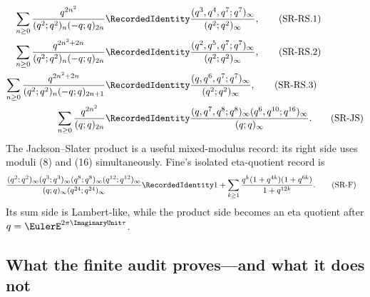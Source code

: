 \begin{align}
 \sum_{n\ge0}\frac{q^{2n^2}}
 {(q^2;q^2)_n(-q;q)_{2n}}
 &\RecordedIdentity
 \frac{(q^3,q^4,q^7;q^7)_\infty}{(q^2;q^2)_\infty},
 \tag{SR-RS.1}\label{qg:eq-record-rs-1}\\
 \sum_{n\ge0}\frac{q^{2n^2+2n}}
 {(q^2;q^2)_n(-q;q)_{2n}}
 &\RecordedIdentity
 \frac{(q^2,q^5,q^7;q^7)_\infty}{(q^2;q^2)_\infty},
 \tag{SR-RS.2}\label{qg:eq-record-rs-2}\\
 \sum_{n\ge0}\frac{q^{2n^2+2n}}
 {(q^2;q^2)_n(-q;q)_{2n+1}}
 &\RecordedIdentity
 \frac{(q,q^6,q^7;q^7)_\infty}{(q^2;q^2)_\infty},
 \tag{SR-RS.3}\label{qg:eq-record-rs-3}\\
 \sum_{n\ge0}\frac{q^{2n^2}}{(q;q)_{2n}}
 &\RecordedIdentity
 \frac{(q,q^7,q^8;q^8)_\infty
       (q^6,q^{10};q^{16})_\infty}
 {(q;q)_\infty}.
 \tag{SR-JS}\label{qg:eq-record-js}
\end{align}
The Jackson--Slater product is a useful mixed-modulus record: its right side
uses moduli (8) and (16) simultaneously.  Fine's isolated eta-quotient
record is
\begin{align}
 &\frac{(q^2;q^2)_\infty(q^3;q^3)_\infty
        (q^8;q^8)_\infty(q^{12};q^{12})_\infty}
       {(q;q)_\infty(q^{24};q^{24})_\infty}
 \RecordedIdentity
 1+\sum_{k\ge1}
 \frac{q^k(1+q^{4k})(1+q^{6k})}{1+q^{12k}}.
 \tag{SR-F}\label{qg:eq-record-fine}
\end{align}
Its sum side is Lambert-like, while the product side becomes an eta quotient
after \(q=\EulerE^{2\pi\ImaginaryUnit\tau}\).

\subsection{What the finite audit proves---and what it does not}

